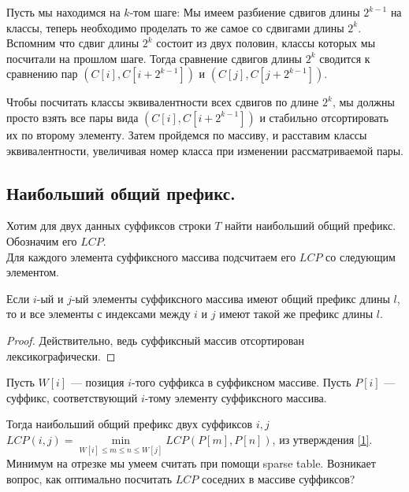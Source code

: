 Пусть мы находимся на $k$-том шаге:
Мы имеем разбиение сдвигов длины $2 ^ {k - 1}$ на классы, теперь необходимо проделать то же самое со сдвигами длины  $2 ^ k$.
Вспомним что сдвиг длины $2 ^ k$ состоит из двух половин, классы которых мы посчитали на прошлом шаге. Тогда сравнение сдвигов длины  $2 ^ k$ сводится к сравнению пар $(C[i], C[i + 2 ^ {k - 1}])$ и $(C[j], C[j + 2 ^ {k - 1}])$.

Чтобы посчитать классы эквивалентности всех сдвигов по длине $2 ^ k$, мы должны просто взять все пары вида $(C[i], C[i + 2 ^ {k - 1}])$ и стабильно отсортировать их по второму элементу. 
Затем пройдемся по массиву, и расставим классы эквивалентности, увеличивая номер класса при изменении рассматриваемой пары. 

\subsection{Наибольший общий префикс.}
Хотим для двух данных суффиксов строки $T$ найти наибольший общий префикс. Обозначим его  $LCP$. \\
Для каждого элемента суффиксного массива подсчитаем его $LCP$ со следующим элементом.

\begin{prop}\label{1}
    Если $i$-ый и  $j$-ый элементы суффиксного массива имеют общий префикс длины  $l$, то и все элементы с индексами между  $i$ и  $j$ имеют такой же префикс длины  $l$.
\end{prop}

\begin{proof}
    Действительно, ведь суффиксный массив отсортирован лексикографически.
\end{proof}

Пусть $W[i]$ --- позиция  $i$-того суффикса в суффиксном массиве.
Пусть $P[i]$ --- суффикс, соответствующий  $i$-тому элементу суффиксного массива.

Тогда наибольший общий префикс двух суффиксов $i, j$ $LCP(i, j) = \min \limits_{W[i] \leq m \leq n \leq W[j]} LCP(P[m], P[n])$, из утверждения \ref{1}. \\
Минимум на отрезке мы умеем считать при помощи sparse table.
Возникает вопрос, как оптимально посчитать $LCP$ соседних в массиве суффиксов?

